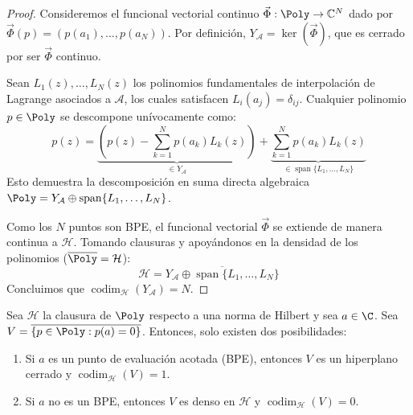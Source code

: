 \begin{proof}
	Consideremos el funcional vectorial continuo $\vec{\Phi}: \Poly \to \mathbb{C}^N$ dado por $\vec{\Phi}(p) = (p(a_1), \dots, p(a_N))$. Por definición, $Y_{\mathcal{A}} = \ker(\vec{\Phi})$, que es cerrado por ser $\vec{\Phi}$ continuo.

	Sean $L_1(z), \dots, L_N(z)$ los polinomios fundamentales de interpolación de Lagrange asociados a $\mathcal{A}$, los cuales satisfacen $L_i(a_j) = \delta_{ij}$. Cualquier polinomio $p \in \Poly$ se descompone unívocamente como:
	$$p(z) = \underbrace{\left( p(z) - \sum_{k=1}^N p(a_k)L_k(z) \right)}_{\in Y_{\mathcal{A}}} + \underbrace{\sum_{k=1}^N p(a_k)L_k(z)}_{\in \operatorname{span}\{L_1, \dots, L_N\}}$$
	Esto demuestra la descomposición en suma directa algebraica $\Poly = Y_{\mathcal{A}} \oplus \operatorname{span}\{L_1, \dots, L_N\}$.

	Como los $N$ puntos son BPE, el funcional vectorial $\vec{\Phi}$ se extiende de manera continua a $\mathcal{H}$. Tomando clausuras y apoyándonos en la densidad de los polinomios ($\overline{\Poly} = \mathcal{H}$):
	$$\mathcal{H} = \overline{Y_{\mathcal{A}} \oplus \operatorname{span}\{L_1, \dots, L_N\}}$$
	Concluimos que $\operatorname{codim}_{\mathcal{H}}(Y_{\mathcal{A}}) = N$.
\end{proof}

\begin{thm}
	\label{thm:dicotomia}
	Sea $\mathcal{H}$ la clausura de $\Poly$ respecto a una norma de Hilbert y sea $a \in \C$. Sea $V = \overline{\{p \in \Poly : p(a)=0\}}$. Entonces, solo existen dos posibilidades:
	\begin{enumerate}
		\item Si $a$ es un punto de evaluación acotada (BPE), entonces $V$ es un hiperplano cerrado y $\operatorname{codim}_{\mathcal{H}}(V) = 1$.
		\item Si $a$ no es un BPE, entonces $V$ es denso en $\mathcal{H}$ y $\operatorname{codim}_{\mathcal{H}}(V) = 0$.
	\end{enumerate}
\end{thm}

